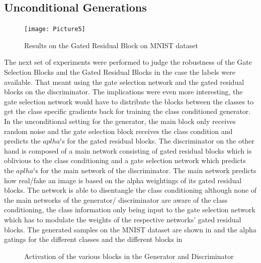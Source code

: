 \subsection{Unconditional Generations}
\begin{figure}
    \centering
    \texttt{[image: Picture5]}
    \caption{Results on the Gated Residual Block on MNIST dataset}\label{fig:grb_mnist}
    \vspace{-4mm}
\end{figure}

The next set of experiments were performed to judge the robustness of the Gate Selection Blocks and the Gated Residual Blocks in the case the labels were available. That meant using the gate selection network and the gated residual blocks on the discriminator. The implications were even more interesting, the gate selection network would have to distribute the blocks between the classes to get the class specific gradients back for training the class conditioned generator. In the unconditional setting for the generator, the main block only receives random noise and the gate selection block receives the class condition and predicts the $aplha^i$s for the gated residual blocks. The discriminator on the other hand is composed of a main network consisting of gated residual blocks which is oblivious to the class conditioning and a gate selection network which predicts the $aplha^i$s for the main network of the discriminator. The main network predicts how real/fake an image is based on the alpha weightings of its gated residual blocks. The network is able to disentangle the class conditioning although none of the main networks of the generator/ discriminator are aware of the class conditioning, the class information only being input to the gate selection network which has to modulate the weights of the respective networks' gated residual blocks. The generated samples on the MNIST dataset are shown in  and the alpha gatings for the different classes and the different blocks in 


\begin{figure}%
    \centering
    \caption{Activation of the various blocks in the Generator and Discriminator}
    \label{fig:mnist_act}
    \vspace{-3mm}
\end{figure}




